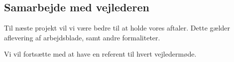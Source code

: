 \documentclass[a4paper,12pt,oneside,article]{memoir}
\begin{document}
    \subsection{Samarbejde med vejlederen}

    Til næste projekt vil vi være bedre til at holde vores aftaler. Dette gælder aflevering af arbejdsblade, samt andre formaliteter.

    Vi vil fortsætte med at have en referent til hvert vejledermøde.

\end{document}
